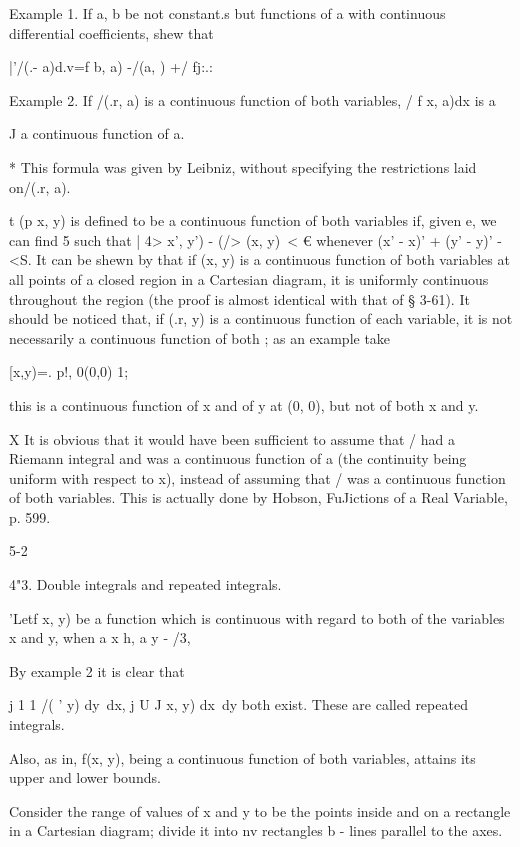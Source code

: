Example 1. If a, b be not constant.s but functions of a with
continuous differential coefficients, shew that

 |'/(.- a)d.v=f b, a) -/(a, ) +/ fj:.:

Example 2. If /(.r, a) is a continuous function of both variables, / f
x, a)dx is a

J a continuous function of a.

* This formula was given by Leibniz, without specifying the
restrictions laid on/(.r, a).

t (p x, y) is defined to be a continuous function of both variables
if, given e, we can find 5 such that | 4> x', y') - (/> (x, y)\ < €
whenever (x' - x)' + (y' - y)' -<S. It can be shewn by that if
(x, y) is a continuous function of both variables at all points of a
closed region in a Cartesian diagram, it is uniformly continuous
throughout the region (the proof is almost identical with that of §
3-61). It should be noticed that, if (.r, y) is a continuous function
of each variable, it is not necessarily a continuous function of both
; as an example take

 [x,y)=. p!, 0(0,0) 1;

this is a continuous function of x and of y at (0, 0), but not of both
x and y.

X It is obvious that it would have been sufficient to assume that /
had a Riemann integral and was a continuous function of a (the
continuity being uniform with respect to x), instead of assuming that
/ was a continuous function of both variables. This is actually done
by Hobson, FuJictions of a Real Variable, p. 599.

5-2

%
%

4"3. Double integrals and repeated integrals.

'Letf x, y) be a function which is continuous with regard to both of
the variables x and y, when a x h, a y - /3,

By example 2 it is clear that

j 1 1 /( ' y) dy\ dx, j U J x, y) dx\ dy both exist. These are called
repeated integrals.

Also, as in, f(x, y), being a continuous function of both
variables, attains its upper and lower bounds.

Consider the range of values of x and y to be the points inside and on
a rectangle in a Cartesian diagram; divide it into nv rectangles b -
lines parallel to the axes.

